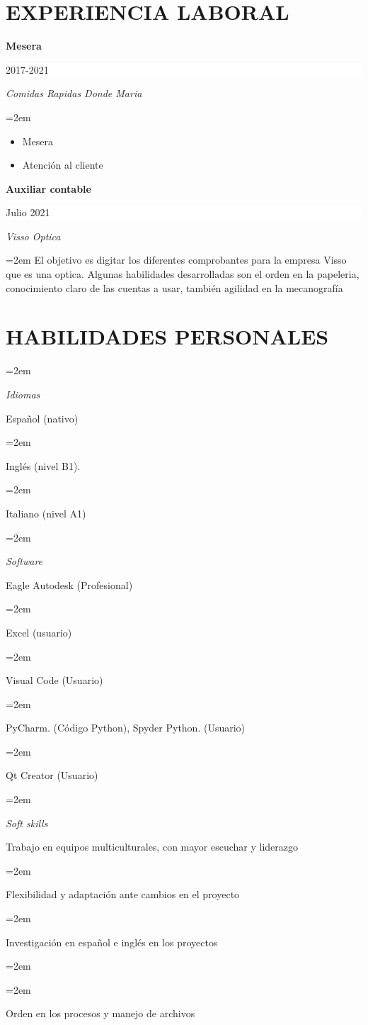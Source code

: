 \documentclass[paper=a4,fontsize=11pt]{scrartcl} %
\newlength{\spacebox}
\newcommand{\sepspace}{\vspace*{1em}}		%
\newcommand{\NewPart}[1]{\section*{\uppercase{#1}}}
\newcommand{\PersonalEntry}[2]{
		\noindent\hangindent=2em\hangafter=0 %
		\parbox{\spacebox}{        %
		\textit{#1}}		       %
		\hspace{1.5em} #2 \par}    %
\newcommand{\SkillsEntry}[2]{      %
		\noindent\hangindent=2em\hangafter=0 %
		\parbox{\spacebox}{        %
		\textit{#1}}			   %
		\hspace{1.5em} #2 \par}    %
\newcommand{\EducationEntry}[4]{
		\noindent \textbf{#1} \hfill      %
		\colorbox{White}{%
			\parbox{5cm}{%
			\hfill\color{Black}#2}} \par  %
		\noindent \textit{#3} \par        %
		\noindent\hangindent=2em\hangafter=0 \small #4 %
		\normalsize \par}
\begin{document}
\NewPart{Experiencia laboral}{}

\EducationEntry{Mesera}{2017-2021}{Comidas Rapidas Donde Maria}{
\begin{itemize}
\item{ Mesera}
\item{ Atención al cliente}
\end{itemize}
}
\sepspace

\EducationEntry{Auxiliar contable}{Julio 2021}{Visso Optica}{El objetivo es digitar los diferentes comprobantes para la empresa Visso que es una optica. Algunas habilidades desarrolladas son el orden en la papeleria, conocimiento claro de las cuentas a usar, también agilidad en la mecanografía}

\NewPart{Habilidades personales}{}

\SkillsEntry{Idiomas}{Español (nativo)}
\SkillsEntry{}{Inglés (nivel B1).}
\SkillsEntry{}{Italiano (nivel A1)}

\SkillsEntry{Software}{Eagle Autodesk (Profesional) }
\SkillsEntry{}{Excel (usuario) }
\SkillsEntry{}{Visual Code (Usuario)}
\SkillsEntry{}{PyCharm. (Código Python), Spyder Python. (Usuario)}
\SkillsEntry{}{Qt Creator (Usuario)}

\SkillsEntry{Soft skills}{Trabajo en equipos multiculturales, con mayor escuchar y liderazgo}
\SkillsEntry{}{Flexibilidad y adaptación ante cambios en el proyecto}
\SkillsEntry{}{Investigación en español e inglés en los proyectos}
\SkillsEntry{}{}
\SkillsEntry{}{Orden en los procesos y manejo de archivos}




\end{document}
